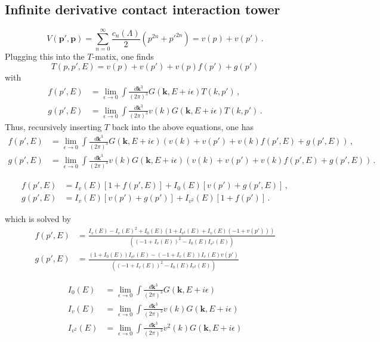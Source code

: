 \documentclass[
    aps,
    prl,
    showkeys,
    nofootinbib,
    floatfix
]{revtex4}
\renewcommand{\vec}[1]{\boldsymbol{#1}}
\begin{document}
\subsection{Infinite derivative contact interaction tower}
\begin{equation}
	V(\vec p', \vec p) = \sum_{n=0}^{\infty} \frac{c_n(\Lambda)}{2} \left( p^{2n} + p'^{2n} \right)  = v(p) + v(p') \, .
\end{equation}
Plugging this into the $T$-matix, one finds
\begin{equation}
	T(p, p', E) = v(p) + v(p') + v(p) f(p') + g(p')
\end{equation}
with
\begin{align}
	f(p', E) &= \lim\limits_{\epsilon \to 0} \int \frac{d \vec k^3}{(2\pi)^3} G(\vec k, E + i \epsilon) T(k, p') \, , \\
	g(p', E) &= \lim\limits_{\epsilon \to 0} \int \frac{d \vec k^3}{(2\pi)^3} v(k) G(\vec k, E + i \epsilon) T(k, p') \, .
\end{align}
Thus, recursively inserting $T$ back into the above equations, one has
\begin{align}
	f(p',E) &= \lim\limits_{\epsilon \to 0} \int \frac{d \vec k^3}{(2\pi)^3} G(\vec k, E + i \epsilon) (v(k) + v(p') + v(k) f(p',E) + g(p',E)) \, , \\
	g(p', E) &= \lim\limits_{\epsilon \to 0} \int \frac{d \vec k^3}{(2\pi)^3} v(k) G(\vec k, E + i \epsilon) (v(k) + v(p') + v(k) f(p',E) + g(p',E)) \, .
\end{align}

\begin{align}
	f(p',E) &= I_v(E) [1 + f(p',E)] + I_0(E) [v(p') + g(p',E)] \, , \\
	g(p',E) &= I_{v}(E)[v(p') + g(p')] + I_{v^2}(E) [1 + f(p')]  \, .
\end{align}

which is solved by
\begin{align}
	f(p',E) &= \frac{I_v(E) -  I_v(E)^2 + I_0(E) (1 + I_{v^2}(E) + I_v(E) (-1 + v(p')))}{((-1 + I_v(E))^2 - I_0(E) I_{v^2}(E))} \\
	g(p',E) &= \frac{(1 + I_0(E)) I_{v^2}(E) - (-1 + I_v(E)) I_v(E) v(p')}{((-1 + I_v(E))^2 - I_0(E) I_{v^2}(E))}
\end{align}

\begin{align}
	I_0(E) &= \lim\limits_{\epsilon \to 0} \int \frac{d \vec k^3}{(2\pi)^3} G(\vec k, E + i \epsilon) \\
	I_v(E) &= \lim\limits_{\epsilon \to 0} \int  \frac{d \vec k^3}{(2\pi)^3} v(k) G(\vec k, E + i \epsilon) \\
	I_{v^2}(E) &= \lim\limits_{\epsilon \to 0} \int  \frac{d \vec k^3}{(2\pi)^3} v^2(k) G(\vec k, E + i \epsilon)
\end{align}
\end{document}
